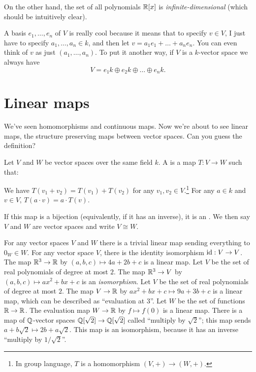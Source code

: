 On the other hand, the set of all polynomials
$\mathbb R[x]$ is \emph{infinite-dimensional}
(which should be intuitively clear).

A basis $e_1, \dots, e_n$ of $V$ is really cool because it means that to specify $v \in V$, I just have to specify $a_1, \dots, a_n \in k$,
and then let $v = a_1 e_1 + \dots + a_n e_n$.
You can even think of $v$ as just $\left( a_1, \dots, a_n \right)$.
To put it another way, if $V$ is a $k$-vector space we always have
\[ V = e_1 k \oplus e_2 k \oplus \dots \oplus e_n k. \]

\section{Linear maps}
We've seen homomorphisms and continuous maps.
Now we're about to see linear maps, the structure preserving maps
between vector spaces. Can you guess the definition?

\begin{definition}
	Let $V$ and $W$ be vector spaces over the same field $k$.
	A  is a map $T \colon V \to W$ such that:
	\begin{enumerate}[(i)]
		\ii We have $T(v_1 + v_2) = T(v_1) + T(v_2)$
		for any $v_1, v_2 \in V$.\footnote{In group language,
			$T$ is a homomorphism $(V,+) \to (W,+)$.}
		\ii For any $a \in k$ and $v \in V$, $T(a \cdot v) = a \cdot T(v)$.
	\end{enumerate}
	If this map is a bijection (equivalently, if it has an inverse),
	it is an .
	We then say $V$ and $W$ are 
	vector spaces and write $V \cong W$.
\end{definition}

\begin{example}
	\listhack
	\begin{enumerate}[(a)]
		\ii For any vector spaces $V$ and $W$ there is a trivial linear map sending everything to $0_W \in W$.
		\ii For any vector space $V$, there is the identity isomorphism $\mathrm{id} : V \to V$.
		\ii The map $\mathbb R^3 \to \mathbb R$ by $(a,b,c) \mapsto 4a+2b+c$ is a linear map.
		\ii Let $V$ be the set of real polynomials of degree at most $2$.
		The map $\mathbb R^3 \to V$ by $(a,b,c) \mapsto ax^2+bx+c$ is an \emph{isomorphism}.
		\ii Let $V$ be the set of real polynomials of degree at most $2$.
		The map $V \to \mathbb R$ by $ax^2+bx+c \mapsto 9a + 3b + c$
		is a linear map, which can be described as ``evaluation at $3$''.
		\ii Let $W$ be the set of functions $\mathbb R \to \mathbb R$.
		The evaluation map $W \to \mathbb R$ by $f \mapsto f(0)$ is a linear map.
		\ii There is a map of $\mathbb Q$-vector spaces $\mathbb Q[\sqrt2] \to \mathbb Q[\sqrt2]$
		called ``multiply by $\sqrt2$''; this map sends $a+b\sqrt2 \mapsto 2b + a\sqrt2$.
		This map is an isomorphism, because it has an inverse ``multiply by $1/\sqrt2$''.
	\end{enumerate}
\end{example}

